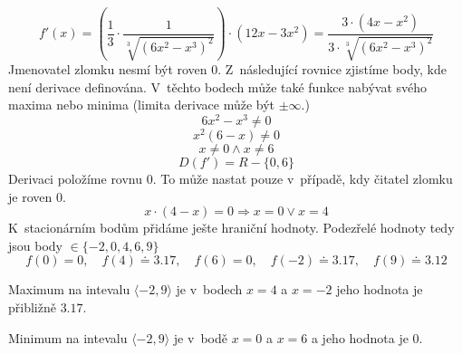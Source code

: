 \begin{displaymath}
f'(x)=\left(\frac{1}{3}\cdot\frac{1}{\sqrt[3]{(6x^2-x^3)^2}}\right)\cdot(12x-3x^2)=\frac{3\cdot(4x-x^2)}{3\cdot\sqrt[3]{(6x^2-x^3)^2}}
\end{displaymath}
Jmenovatel zlomku nesmí být roven 0. Z~následující rovnice zjistíme body, kde není derivace definována. V~těchto bodech může také funkce nabývat svého maxima nebo minima (limita derivace může být $\pm \infty$.)
\begin{displaymath}
6x^2-x^3\neq0
\end{displaymath}
\begin{displaymath}
x^2(6-x)\neq0
\end{displaymath}
\begin{displaymath}
x\neq0 \wedge  x\neq6
\end{displaymath}
\begin{displaymath}
D(f')=R-\{0,6\}
\end{displaymath}
Derivaci položíme rovnu 0. To může nastat pouze v~případě, kdy čitatel zlomku je roven 0.
\begin{displaymath}
x\cdot(4-x) = 0 \Rightarrow x = 0 \vee x = 4
\end{displaymath}
K~stacionárním bodům přidáme ješte hraniční hodnoty. 
Podezřelé hodnoty tedy jsou body $ \in\{-2,0,4,6,9\} $
\begin{displaymath}
f(0) = 0,\quad f(4) \doteq 3.17,\quad f(6) = 0,\quad f(-2) \doteq 3.17,\quad f(9) \doteq 3.12
\end{displaymath}

Maximum na intevalu $ \langle-2,9\rangle$ je v~bodech $x=4$ a $x=-2$ jeho hodnota je přibližně $3.17$.

Minimum na intevalu $ \langle-2,9\rangle$ je v~bodě $x=0$ a $x=6$ a jeho hodnota je $0$.
